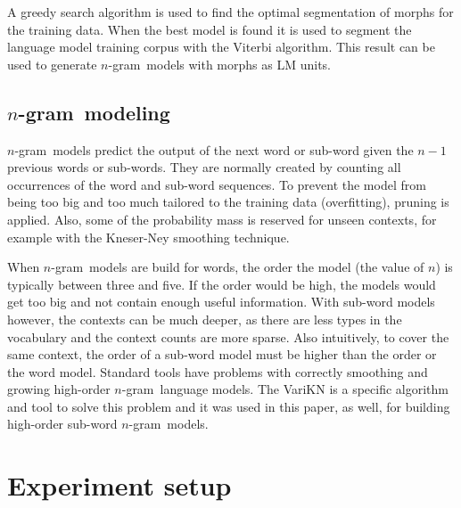 \documentclass[b5paper]{article}
\newcommand{\note}[1]{{\textcolor{blue}{#1}}}
\newcommand{\ngram}{$n$-gram}
\begin{document}
A greedy search algorithm is used to find the optimal segmentation of morphs for the training data.  When the best model is found it is used to segment the language model training corpus with the Viterbi algorithm. This result can be used to generate \ngram\ models with morphs as LM units.



\subsection{\ngram\ modeling}

\ngram\ models predict the output of the next word or sub-word given the $n-1$ previous words or sub-words. They are normally created by counting all occurrences of the word and sub-word sequences. To prevent the model from being too big and too much tailored to the training data (overfitting), pruning is applied. Also, some of the probability mass is reserved for unseen contexts, for example with the Kneser-Ney smoothing technique\cite{chen1996empirical}.

When \ngram\ models are build for words, the order the model (the value of $n$) is typically between three and five. If the order would be high, the models would get too big and not contain enough useful information. With sub-word models however, the contexts can be much deeper, as there are less types in the vocabulary and the context counts are more sparse. Also intuitively, to cover the same context, the order of a sub-word model must be higher than the order or the word model.
Standard tools have problems with correctly smoothing and growing high-order \ngram\ language models.  The VariKN  \cite{siivola2007growing} is a specific algorithm and tool to solve this problem and it was used in this paper, as well, for building high-order sub-word  \ngram\ models. %



\section{Experiment setup}

\end{document}

